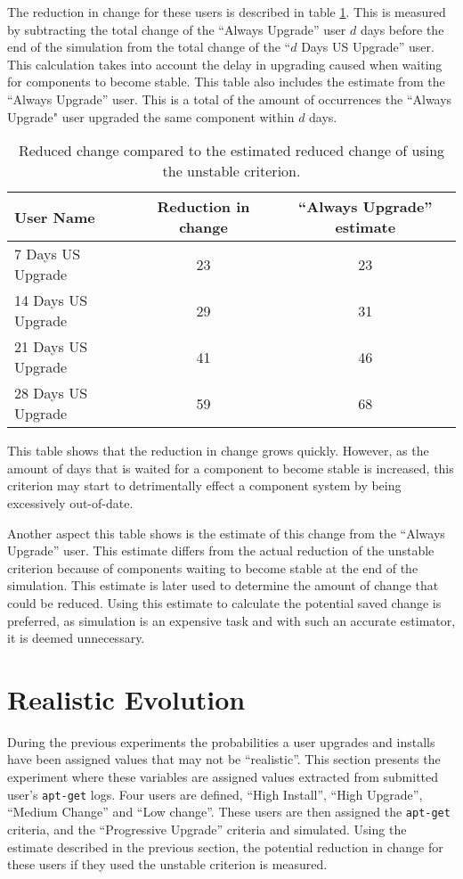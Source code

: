 The reduction in change for these users is described in table \ref{exp.tblsvchange}.
This is measured by subtracting the total change of the ``Always Upgrade'' user $d$ days before the end of the simulation
from the total change of the  ``$d$ Days US Upgrade'' user.
This calculation takes into account the delay in upgrading caused when waiting for components to become stable.
This table also includes the estimate from the ``Always Upgrade'' user.
This is a total of the amount of occurrences the ``Always Upgrade" user upgraded the same component within $d$ days.
\begin{table}[h!]
\centering
\begin{tabular}{|l | c | c | }
\hline
User Name 				& Reduction in change 	& ``Always Upgrade'' estimate		\\ \hline
7 Days US Upgrade		& 23 					& 23 			 \\
14 Days US Upgrade		& 29	 				& 31			\\
21 Days US Upgrade		& 41 					& 46 			 \\
28 Days US Upgrade 		& 59 					& 68			\\ \hline
\end{tabular}
\caption{Reduced change compared to the estimated reduced change of using the unstable criterion.}
\label{exp.tblsvchange}
\end{table}

This table shows that the reduction in change grows quickly.
However, as the amount of days that is waited for a component to become stable is increased, this criterion may start to detrimentally effect a component system by being excessively out-of-date.

Another aspect this table shows is the estimate of this change from the ``Always Upgrade'' user.
This estimate differs from the actual reduction of the unstable criterion because of components waiting to become stable at the end of the simulation.
This estimate is later used to determine the amount of change that could be reduced.
Using this estimate to calculate the potential saved change is preferred,
as simulation is an expensive task and with such an accurate estimator, it is deemed unnecessary. 

\section{Realistic Evolution}
\label{exp.realuserssim}
During the previous experiments the probabilities a user upgrades and installs have been assigned values that may not be ``realistic''.
This section presents the experiment where these variables are assigned values extracted from submitted user's \texttt{apt-get} logs.
Four users are defined, ``High Install'', ``High Upgrade'', ``Medium Change'' and ``Low change''.
These users are then assigned the \texttt{apt-get} criteria, and the ``Progressive Upgrade'' criteria and simulated.
Using the estimate described in the previous section, the potential reduction in change for these users if they used the unstable criterion is measured.

